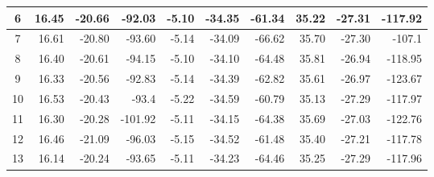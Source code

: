 \begin{table}[]
{\begin{tabular}{|c|r|r|r|r|r|r|r|r|r|}
6       & 16.45                       & -20.66                      & -92.03                                 & -5.10                        & -34.35                      & -61.34                                 & 35.22                       & -27.31                      & -117.92                                \\ \hline
7       & 16.61                       & -20.80                       & -93.60                                  & -5.14                       & -34.09                      & -66.62                                 & 35.70                        & -27.30                       & -107.1                                 \\ \hline
8       & 16.40                        & -20.61                      & -94.15                                 & -5.10                        & -34.10                       & -64.48                                 & 35.81                       & -26.94                      & -118.95                                \\ \hline
9       & 16.33                       & -20.56                      & -92.83                                 & -5.14                       & -34.39                      & -62.82                                 & 35.61                       & -26.97                      & -123.67                                \\ \hline
10      & 16.53                       & -20.43                      & -93.4                                  & -5.22                       & -34.59                      & -60.79                                 & 35.13                       & -27.29                      & -117.97                                \\ \hline
11      & 16.30                        & -20.28                      & -101.92                                & -5.11                       & -34.15                      & -64.38                                 & 35.69                       & -27.03                      & -122.76                                \\ \hline
12      & 16.46                       & -21.09                      & -96.03                                 & -5.15                       & -34.52                      & -61.48                                 & 35.40                        & -27.21                      & -117.78                                \\ \hline
13      & 16.14                       & -20.24                      & -93.65                                 & -5.11                       & -34.23                      & -64.46                                 & 35.25                       & -27.29                      & -117.96                                \\ \hline

\end{tabular}}
\end{table}
